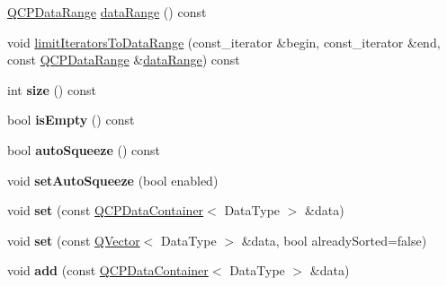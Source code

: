 \begin{DoxyCompactItemize}
\item 
\hyperlink{class_q_c_p_data_range}{Q\+C\+P\+Data\+Range} \hyperlink{class_q_c_p_data_container_aece90eeb2ba8d3c46d3d94023630fbc7}{data\+Range} () const
\item 
void \hyperlink{class_q_c_p_data_container_aa1b36f5ae86a5a5a0b92141d3a0945c4}{limit\+Iterators\+To\+Data\+Range} (const\+\_\+iterator \&begin, const\+\_\+iterator \&end, const \hyperlink{class_q_c_p_data_range}{Q\+C\+P\+Data\+Range} \&\hyperlink{class_q_c_p_data_container_aece90eeb2ba8d3c46d3d94023630fbc7}{data\+Range}) const
\item 
\mbox{\label{class_q_c_p_data_container_a8e9b262c739672e13472d0d45b720258}} 
int {\bfseries size} () const
\item 
\mbox{\label{class_q_c_p_data_container_a7bdebfccd2f9f84bf032882f9d6b00a8}} 
bool {\bfseries is\+Empty} () const
\item 
\mbox{\label{class_q_c_p_data_container_a64f0f1621ca46de2352eaf87476db9b1}} 
bool {\bfseries auto\+Squeeze} () const
\item 
\mbox{\label{class_q_c_p_data_container_a233f866760a78950d2a393c1a4bc54b5}} 
void {\bfseries set\+Auto\+Squeeze} (bool enabled)
\item 
\mbox{\label{class_q_c_p_data_container_ae7042bd534fc3ce7befa2ce3f790b5bf}} 
void {\bfseries set} (const \hyperlink{class_q_c_p_data_container}{Q\+C\+P\+Data\+Container}$<$ Data\+Type $>$ \&data)
\item 
\mbox{\label{class_q_c_p_data_container_aff99fffbb26597a354c4bc8312596ab2}} 
void {\bfseries set} (const \hyperlink{class_q_vector}{Q\+Vector}$<$ Data\+Type $>$ \&data, bool already\+Sorted=false)
\item 
\mbox{\label{class_q_c_p_data_container_a42b98bd994307ccd163a43d576f91ad9}} 
void {\bfseries add} (const \hyperlink{class_q_c_p_data_container}{Q\+C\+P\+Data\+Container}$<$ Data\+Type $>$ \&data)
\item 
\mbox{\label{class_q_c_p_data_container_a51d2a4c9ce4baf5e950b767d26673972}} 

\end{DoxyCompactItemize}
